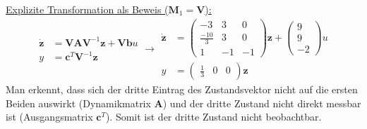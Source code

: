 \documentclass{article}
\begin{document}
\begin{task}
\begin{enumerate}[i]
\begin{solution}
 \underline{Explizite Transformation als Beweis ($\mathbf{M}_1 = \mathbf{V}$):}
 \[ \begin{aligned}\dot{\mathbf{z}} &= \mathbf{V}\mathbf{A}\mathbf{V}^{-1}\mathbf{z}+\mathbf{V}\mathbf{b}u\\
 y &= \mathbf{c}^T \mathbf{V}^{-1}\mathbf{z}
 \end{aligned} \rightarrow
 \begin{aligned}\dot{\mathbf{z}} &= 
 \begin{pmatrix}
 -3 & 3 & 0\\
 \frac{-10}{3} & 3 & 0\\
 1 & -1 & -1
 \end{pmatrix}
 \mathbf{z}+
 \begin{pmatrix}
 9\\9\\-2
 \end{pmatrix}
 u\\
 y &= \begin{pmatrix}
 \frac{1}{3}&0&0
 \end{pmatrix}\mathbf{z}
 \end{aligned}
 \]
 Man erkennt, dass sich der dritte Eintrag des Zustandsvektor nicht auf die ersten Beiden auswirkt (Dynamikmatrix $\mathbf{A}$) und der dritte Zustand nicht direkt messbar ist (Ausgangsmatrix $\mathbf{c}^T$). Somit ist der dritte Zustand nicht beobachtbar.
 \end{solution}
 \end{enumerate}
\end{task}
\end{document}

